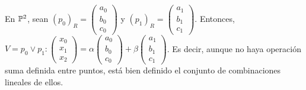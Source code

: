 \begin{obs}
    En $\mathbb{P} ^2$, sean $\left( p_0 \right)_R = \begin{pmatrix} a_0 \\ b_0 \\ c_0 \end{pmatrix}$ y $\left( p_1 \right)_R = \begin{pmatrix} a_1 \\ b_1 \\ c_1 \end{pmatrix}$. Entonces, $V=p_0 \vee p_1 \colon \begin{pmatrix} x_0 \\ x_1 \\ x_2 \end{pmatrix} = \alpha \begin{pmatrix} a_0 \\ b_0 \\ c_0 \end{pmatrix} + \beta \begin{pmatrix} a_1 \\ b_1 \\ c_1 \end{pmatrix}$. 
    Es decir, aunque no haya operación suma definida entre puntos, está bien definido el conjunto de combinaciones lineales de ellos.
\end{obs}
